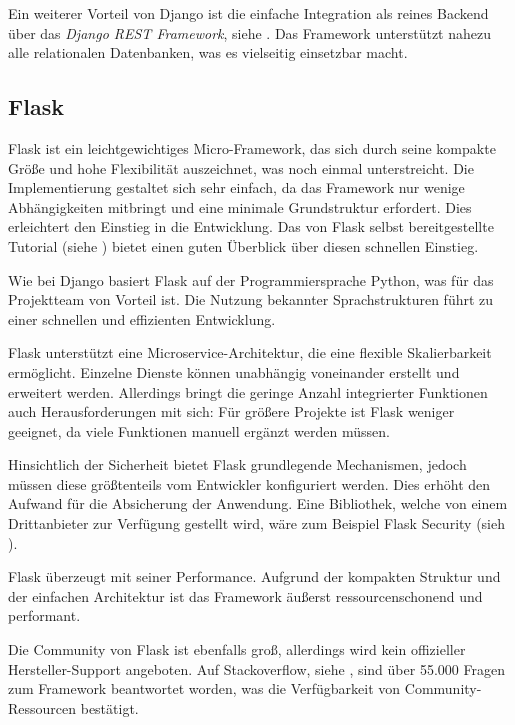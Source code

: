 Ein weiterer Vorteil von Django ist die einfache Integration als reines Backend über das \textit{Django REST Framework}, siehe \cite{website-django-rest-framework}. Das Framework unterstützt nahezu alle relationalen Datenbanken, was es vielseitig einsetzbar macht.


\subsection{Flask}
Flask ist ein leichtgewichtiges Micro-Framework, das sich durch seine kompakte Größe und hohe Flexibilität auszeichnet, was \cite{website-flask-overview} noch einmal unterstreicht. Die Implementierung gestaltet sich sehr einfach, da das Framework nur wenige Abhängigkeiten mitbringt und eine minimale Grundstruktur erfordert. Dies erleichtert den Einstieg in die Entwicklung. Das von Flask selbst bereitgestellte Tutorial (siehe \cite{website-flask-tutorial}) bietet einen guten Überblick über diesen schnellen Einstieg. 

Wie bei Django basiert Flask auf der Programmiersprache Python, was für das Projektteam von Vorteil ist. Die Nutzung bekannter Sprachstrukturen führt zu einer schnellen und effizienten Entwicklung.

Flask unterstützt eine Microservice-Architektur, die eine flexible Skalierbarkeit ermöglicht. Einzelne Dienste können unabhängig voneinander erstellt und erweitert werden. Allerdings bringt die geringe Anzahl integrierter Funktionen auch Herausforderungen mit sich: Für größere Projekte ist Flask weniger geeignet, da viele Funktionen manuell ergänzt werden müssen.

Hinsichtlich der Sicherheit bietet Flask grundlegende Mechanismen, jedoch müssen diese größtenteils vom Entwickler konfiguriert werden. Dies erhöht den Aufwand für die Absicherung der Anwendung. Eine Bibliothek, welche von einem Drittanbieter zur Verfügung gestellt wird, wäre zum Beispiel Flask Security (sieh \cite{website-flask-security}).

Flask überzeugt mit seiner Performance. Aufgrund der kompakten Struktur und der einfachen Architektur ist das Framework äußerst ressourcenschonend und performant.

Die Community von Flask ist ebenfalls groß, allerdings wird kein offizieller Hersteller-Support angeboten. Auf Stackoverflow, siehe \cite{website-stackoverflow-flask}, sind über 55.000 Fragen zum Framework beantwortet worden, was die Verfügbarkeit von Community-Ressourcen bestätigt.

